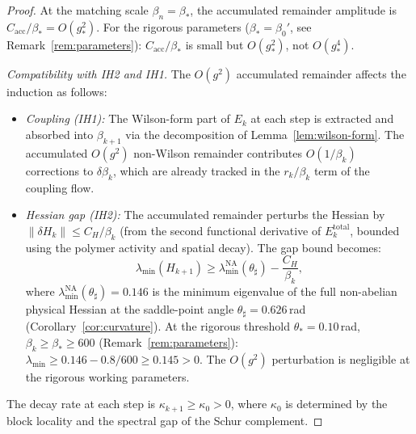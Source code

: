 \documentclass[11pt]{article}
\theoremstyle{definition}
\begin{document}
\begin{proof}
At the matching scale $\beta_n=\beta_*$, the accumulated
remainder amplitude is $C_{\mathrm{acc}}/\beta_*=O(g_*^2)$.
For the rigorous parameters ($\beta_*=\beta_0'$,
see Remark~\ref{rem:parameters}):
$C_{\mathrm{acc}}/\beta_*$ is small but $O(g_*^2)$, not $O(g_*^4)$.

\smallskip\noindent\emph{Compatibility with IH2 and IH1.}
The $O(g^2)$ accumulated remainder affects the induction as follows:
\begin{itemize}[nosep]
\item \emph{Coupling (IH1):} The Wilson-form part of $E_k$ at
  each step is extracted and absorbed into $\beta_{k+1}$ via the
  decomposition of Lemma~\ref{lem:wilson-form}.  The
  accumulated $O(g^2)$ non-Wilson remainder contributes
  $O(1/\beta_k)$ corrections to $\delta\beta_k$, which are
  already tracked in the $r_k/\beta_k$ term of the coupling flow.
\item \emph{Hessian gap (IH2):} The accumulated remainder
  perturbs the Hessian by $\|\delta H_k\|\le C_H/\beta_k$
  (from the second functional derivative of $E_k^{\mathrm{total}}$,
  bounded using the polymer activity and spatial decay).
  The gap bound becomes:
  \begin{equation}
  \lambda_{\min}(H_{k+1})
  \ge\lambda_{\min}^{\mathrm{NA}}(\theta_\sharp)
  -\frac{C_H}{\beta_k},
  \end{equation}
  where $\lambda_{\min}^{\mathrm{NA}}(\theta_\sharp)=0.146$ is the
  minimum eigenvalue of the full non-abelian physical Hessian at
  the saddle-point angle $\theta_\sharp=0.626$\,rad
  (Corollary~\ref{cor:curvature}).
  At the rigorous threshold $\theta_*=0.10$\,rad,
  $\beta_k\ge\beta_*\ge 600$
  (Remark~\ref{rem:parameters}):
  $\lambda_{\min}\ge 0.146-0.8/600
  \ge 0.145>0$.
  The $O(g^2)$ perturbation is negligible at the rigorous
  working parameters.
\end{itemize}

The decay rate at each step is
$\kappa_{k+1}\ge\kappa_0>0$, where $\kappa_0$ is determined by the
block locality and the spectral gap of the Schur complement.


\end{proof}
\end{document}

